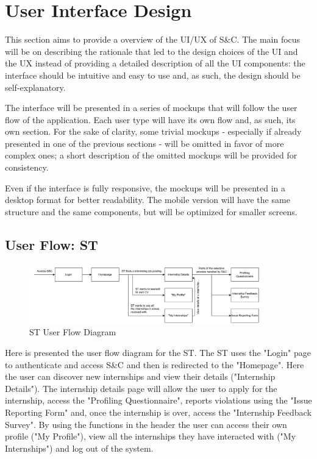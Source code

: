 \chapter{User Interface Design}
\label{chap:user-interface-design}%

\par This section aims to provide a overview of the UI/UX of S\&C. The main focus will be on describing the rationale
that led to the design choices of the UI and the UX instead of providing a detailed description of all the UI
components: the interface should be intuitive and easy to use and, as such, the design should be self-explanatory.

\par The interface will be presented in a series of mockups that will follow the user flow of the application. Each
user type will have its own flow and, as such, its own section. For the sake of clarity, some trivial mockups -
especially if already presented in one of the previous sections - will be omitted in favor of more complex ones; a
short description of the omitted mockups will be provided for consistency.

\par Even if the interface is fully responsive, the mockups will be presented in a desktop format for better
readability. The mobile version will have the same structure and the same components, but will be optimized for
smaller screens.

\section{User Flow: ST}
\label{sec:user-flow-st}%

\begin{figure}[H]
    \centering
    \includegraphics[width=0.9\textwidth]{Images/GUI/ST/Diagram.pdf}
    \caption{ST User Flow Diagram}
    \label{fig:st-user-flow-diagram}
\end{figure}

\par Here is presented the user flow diagram for the ST. The ST uses the "Login" page to authenticate and access S\&C
and then is redirected to the "Homepage". Here the user can discover new internships and view their details
("Internship Details"). The internship details page will allow the user to apply for the internship, access the
"Profiling Questionnaire", reports violations using the "Issue Reporting Form" and, once the internship is over,
access the "Internship Feedback Survey". By using the functions in the header the user can access their own profile
("My Profile"), view all the internships they have interacted with ("My Internships") and log out of the system.

